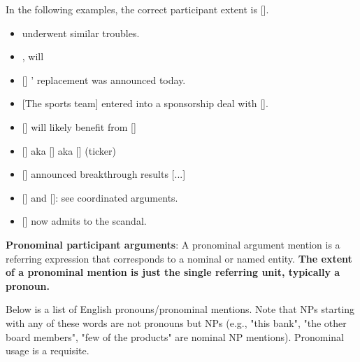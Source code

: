 In the following examples, the correct participant extent is [].
\begin{itemize}[noitemsep]
    \item { underwent similar troubles.}
    \item {}, will
    \item {[]} ' replacement was announced today.
    \item {[The  sports team] entered into a sponsorship deal with [].}
    \item {[] will likely benefit from []}
    \item {[]} aka [] aka [] (ticker)
    \item {[]} announced breakthrough results [...]
    \item {[]} and []: see coordinated arguments.
    \item {[]} now admits to the scandal.
\end{itemize}

\noindent\textbf{Pronominal participant arguments}:
A pronominal argument mention is a referring expression that corresponds to a nominal or named entity.
\textbf{The extent of a pronominal mention is just the single referring unit, typically a pronoun.}

Below is a list of English pronouns/pronominal mentions. 
Note that NPs starting with any of these words are not pronouns but NPs (e.g., "this bank", "the other board members", "few of the products" are nominal NP mentions).
Pronominal usage is a requisite.

